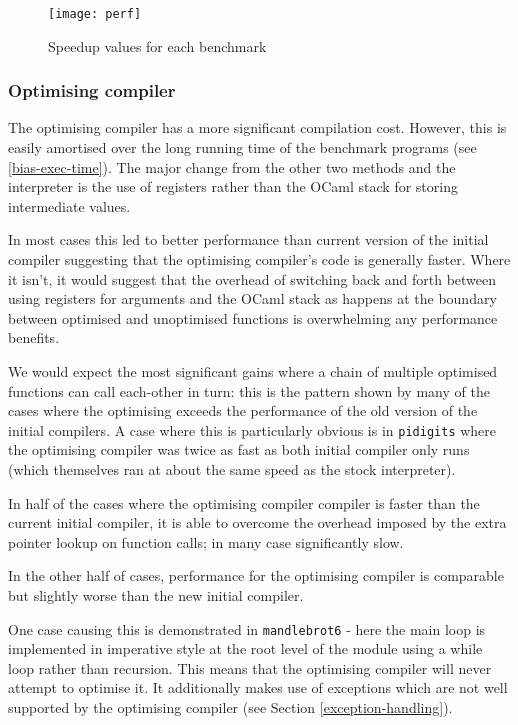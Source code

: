 \begin{landscape}
      \begin{figure}[h]
            \texttt{[image: perf]}
            \caption{Speedup values for each benchmark}
            \label{fig:perf}
      \end{figure}
\end{landscape}

\subsubsection{Optimising compiler}

The optimising compiler has a more significant compilation cost. However, this is easily amortised
over the long running time of the benchmark programs (see \ref{bias-exec-time}). The major change
from the other two methods and the interpreter is the use of registers rather than the OCaml stack
for storing intermediate values.

In most cases this led to better performance than current version of the initial compiler
suggesting
that the optimising compiler's code is generally faster. Where it isn't, it would suggest that the
overhead of switching back and forth between using registers for arguments and the OCaml stack as
happens at the boundary between optimised and unoptimised functions is overwhelming any performance
benefits.

We would expect the most significant gains where a chain of multiple optimised functions can call
each-other in turn: this is the pattern shown by many of the cases where the optimising exceeds the
performance of the old version of the initial compilers. A case where this is particularly obvious
is in
\texttt{pidigits} where the optimising compiler was twice as fast as both initial compiler only
runs
(which themselves ran at about the same speed as the stock interpreter).

In half of the cases where the optimising compiler compiler is faster than the current initial
compiler, it is able to overcome the overhead imposed by the extra pointer lookup on function
calls; in many
case significantly slow.

In the other half of cases, performance for the optimising compiler is comparable but slightly
worse
than the new initial compiler.

One case causing this is demonstrated in \texttt{mandlebrot6} - here the main loop is implemented
in
imperative style at the root level of the module using a while loop rather than recursion. This
means that the optimising compiler will never attempt to optimise it. It additionally makes use of
exceptions which are not well supported by the optimising compiler (see Section
\ref{exception-handling}).

